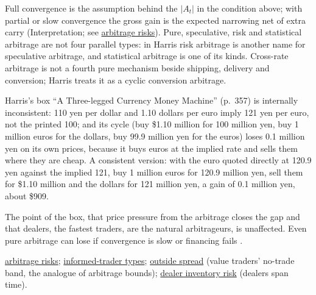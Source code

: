 \begin{qfdefinition}
 Full convergence is the assumption behind the $|A_t|$ in the condition above; with partial or slow convergence the gross gain is the expected narrowing net of extra carry (Interpretation; see \hyperref[res:arbitrage-risks]{arbitrage risks}). Pure, speculative, risk and statistical arbitrage are not four parallel types: in Harris risk arbitrage is another name for speculative arbitrage, and statistical arbitrage is one of its kinds. Cross-rate arbitrage is not a fourth pure mechanism beside shipping, delivery and conversion; Harris treats it as a cyclic conversion arbitrage.

Harris's box ``A Three-legged Currency Money Machine'' (p.~357) is internally inconsistent: 110 yen per dollar and 1.10 dollars per euro imply 121 yen per euro, not the printed 100; and its cycle (buy \$1.10 million for 100 million yen, buy 1 million euros for the dollars, buy 99.9 million yen for the euros) loses 0.1 million yen on its own prices, because it buys euros at the implied rate and sells them where they are cheap. A consistent version: with the euro quoted directly at 120.9 yen against the implied 121, buy 1 million euros for 120.9 million yen, sell them for \$1.10 million and the dollars for 121 million yen, a gain of 0.1 million yen, about \$909.

The point of the box, that price pressure from the arbitrage closes the gap and that dealers, the fastest traders, are the natural arbitrageurs, is unaffected. Even pure arbitrage can lose if convergence is slow or financing fails \citep[same chap., secs.~17.3.1 and~17.9, pp.~350 and~378]{alpha-harris}.

 \hyperref[res:arbitrage-risks]{arbitrage risks}; \hyperref[def:informed-trader-types]{informed-trader types}; \hyperref[def:outside-spread]{outside spread} (value traders' no-trade band, the analogue of arbitrage bounds); \hyperref[def:dealer-inventory-risk]{dealer inventory risk} (dealers span time).

\end{qfdefinition}

